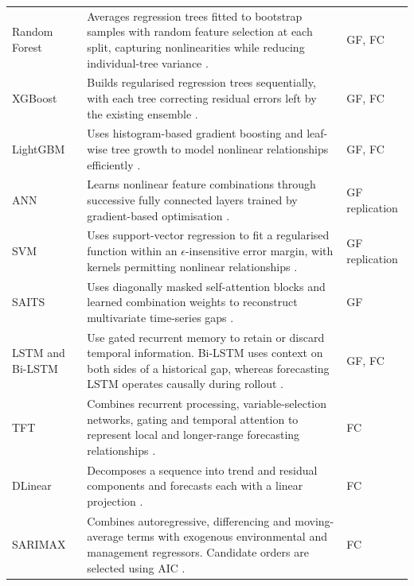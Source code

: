 {\begin{longtable}{
  @{}
  >{\raggedright\arraybackslash}p{}
  >{\raggedright\arraybackslash}p{}
  >{\raggedright\arraybackslash}p{}
  @{}
  }
  Random Forest &
  Averages regression trees fitted to bootstrap samples with random feature
  selection at each split, capturing nonlinearities while reducing individual-tree
  variance \cite{breiman2001randomforests,irvin2021,kim2020,zhu2023a}. &
  GF, FC \\

  XGBoost &
  Builds regularised regression trees sequentially, with each tree correcting
  residual errors left by the existing ensemble
  \cite{chen2016xgboost,irvin2021}. &
  GF, FC \\

  LightGBM &
  Uses histogram-based gradient boosting and leaf-wise tree growth to model
  nonlinear relationships efficiently \cite{ke2017lightgbm}. &
  GF, FC \\

  ANN &
  Learns nonlinear feature combinations through successive fully connected
  layers trained by gradient-based optimisation
  \cite{rumelhart1986backprop,kim2020}. &
  GF replication \\

  SVM &
  Uses support-vector regression to fit a regularised function within an
  $\epsilon$-insensitive error margin, with kernels permitting nonlinear
  relationships \cite{drucker1997svr,kim2020}. &
  GF replication \\

  SAITS &
  Uses diagonally masked self-attention blocks and learned combination weights
  to reconstruct multivariate time-series gaps \cite{du2023saits}. &
  GF \\

  LSTM and Bi-LSTM &
  Use gated recurrent memory to retain or discard temporal information.
  Bi-LSTM uses context on both sides of a historical gap, whereas forecasting
  LSTM operates causally during rollout
  \cite{hochreiter1997lstm,schuster1997bidirectional}. &
  GF, FC \\

  TFT &
  Combines recurrent processing, variable-selection networks, gating and
  temporal attention to represent local and longer-range forecasting
  relationships \cite{lim2021tft}. &
  FC \\

  DLinear &
  Decomposes a sequence into trend and residual components and forecasts each
  with a linear projection \cite{zeng2023}. &
  FC \\

  SARIMAX &
  Combines autoregressive, differencing and moving-average terms with exogenous
  environmental and management regressors. Candidate orders are selected using
  AIC \cite{box2015timeseries}. &
  FC \\


\end{longtable}}
